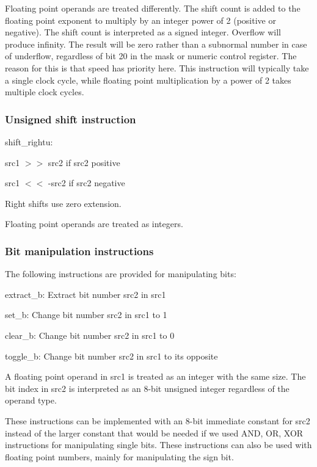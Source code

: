 \documentclass[forwardcom.tex]{subfiles}
\begin{document}
Floating point operands are treated differently. The shift count is added to the floating
point exponent to multiply by an integer power of 2 (positive or negative).
The shift count is interpreted as a signed integer. Overflow will produce
infinity. The result will be zero rather than a subnormal number in case of underflow,
regardless of bit 20 in the mask or numeric control register. The reason for this is that
speed has priority here. This instruction will typically take a single clock cycle, while
floating point multiplication by a power of 2 takes multiple clock cycles. 


\subsubsection{Unsigned shift instruction}

shift\_rightu: 

src1 $>>$ src2 if src2 positive

src1 $<<$ -src2 if src2 negative
\vspace{2mm}

Right shifts use zero extension. 

Floating point operands are treated
as integers.


\subsubsection{Bit manipulation instructions}
The following instructions are provided for manipulating bits: 
\vspace{2mm}

extract\_b: Extract bit number src2 in src1

set\_b: Change bit number src2 in src1 to 1

clear\_b: Change bit number src2 in src1 to 0

toggle\_b: Change bit number src2 in src1 to its opposite
\vspace{2mm}

A floating point operand in src1 is treated as an integer with the same size. The bit index in src2 is interpreted as an 8-bit unsigned integer regardless of the operand type.
\vspace{2mm}

These instructions can be implemented with an 8-bit immediate constant for src2 instead of the larger constant that would be needed if we used AND, OR, XOR instructions for manipulating single bits. These instructions can also be used with floating point numbers, mainly for manipulating the sign bit.
\end{document}
